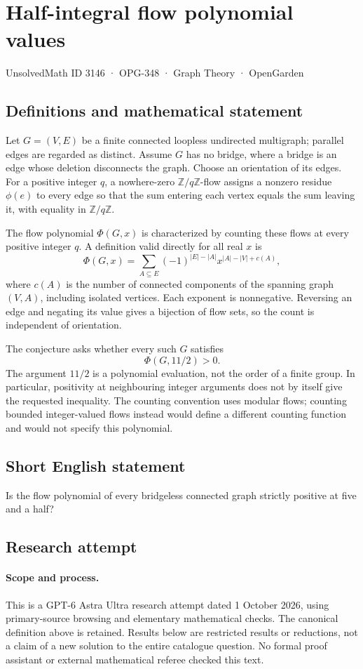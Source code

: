 \documentclass[11pt,a4paper]{article}
\begin{document}
\section*{Half-integral flow polynomial values}\label{3146}
{\small UnsolvedMath ID 3146 · OPG-348 · Graph Theory · OpenGarden}
\subsection{Definitions and mathematical statement}
Let $G=(V,E)$ be a finite connected loopless undirected multigraph;
parallel edges are regarded as distinct. Assume $G$ has no bridge,
where a bridge is an edge whose deletion disconnects the graph.
Choose an orientation of its edges. For a positive integer $q$, a
nowhere-zero $\mathbb Z/q\mathbb Z$-flow assigns a nonzero residue
$\phi(e)$ to every edge so that the sum entering each vertex equals
the sum leaving it, with equality in $\mathbb Z/q\mathbb Z$.

The flow polynomial $\Phi(G,x)$ is characterized by counting these
flows at every positive integer $q$. A definition valid directly
for all real $x$ is
\[
 \Phi(G,x)=\sum_{A\subseteq E}(-1)^{|E|-|A|}
 x^{|A|-|V|+c(A)},
\]
where $c(A)$ is the number of connected components of the spanning
graph $(V,A)$, including isolated vertices. Each exponent is
nonnegative. Reversing an edge and negating its value gives a
bijection of flow sets, so the count is independent of orientation.

The conjecture asks whether every such $G$ satisfies
\[
 \Phi(G,11/2)>0.
\]
The argument $11/2$ is a polynomial evaluation, not the order of
a finite group. In particular, positivity at neighbouring integer
arguments does not by itself give the requested inequality.
The counting convention uses modular flows; counting bounded
integer-valued flows instead would define a different counting
function and would not specify this polynomial.
\subsection{Short English statement}
Is the flow polynomial of every bridgeless connected graph strictly positive at five and a half?
\subsection{Research attempt}
\paragraph{Scope and process.}
This is a GPT-6 Astra Ultra research attempt dated 1 October 2026, using
primary-source browsing and elementary mathematical checks. The canonical
definition above is retained. Results below are restricted results or
reductions, not a claim of a new solution to the entire catalogue question.
No formal proof assistant or external mathematical referee checked this text.
\end{document}
